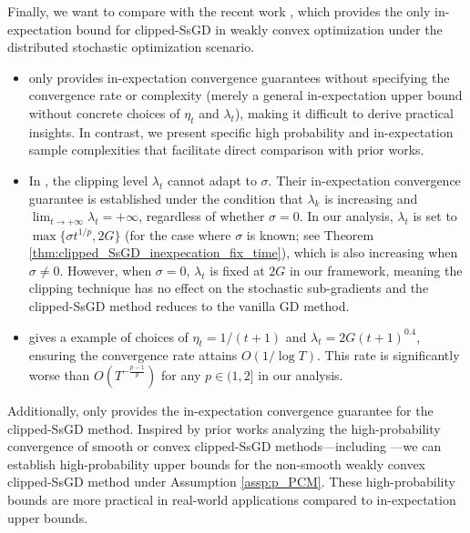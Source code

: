 \documentclass{article}
\begin{document}
Finally, we want to compare with the recent work \citep{hu_2025}, which provides the only in-expectation bound for clipped-SsGD in weakly convex optimization under the distributed stochastic optimization scenario.
\begin{itemize}
    \item \citep{hu_2025} only provides in-expectation convergence guarantees without specifying the convergence rate or complexity (merely a general in-expectation upper bound without concrete choices of $\eta_t$ and $\lambda_t$), making it difficult to derive practical insights. In contrast, we present specific high probability and in-expectation sample complexities that facilitate direct comparison with prior works.
    \item In \citep{hu_2025}, the clipping level $\lambda_t$ cannot adapt to $\sigma$. Their in-expectation convergence guarantee is established under the condition that $\lambda_k$ is increasing and $\lim_{t\rightarrow +\infty}\lambda_t=+\infty$, regardless of whether $\sigma = 0$. In our analysis, $\lambda_t$ is set to $\max\{\sigma t^{1/p},2G\}$ (for the case where $\sigma$ is known; see Theorem \ref{thm:clipped_SsGD_inexpecation_fix_time}), which is also increasing when $\sigma \neq 0$. However, when $\sigma = 0$, $\lambda_t$ is fixed at $2G$ in our framework, meaning the clipping technique has no effect on the stochastic sub-gradients and the clipped-SsGD method reduces to the vanilla GD method.
    \item \citep{hu_2025} gives a example of choices of $\eta_t = 1/(t+1)$ and $\lambda_t = 2G(t+1)^{0.4}$, ensuring the convergence rate attains $O(1/\log T)$. This rate is significantly worse than $O(T^{-\frac{p-1}{p}})$ for any $p \in (1, 2]$ in our analysis.
\end{itemize}
Additionally, \citep{hu_2025} only provides the in-expectation convergence guarantee for the clipped-SsGD method. Inspired by prior works analyzing the high-probability convergence of smooth or convex clipped-SsGD methods—including \citep{Cutkosky_2021,liu_2023c,liuzijian_2023,liu_2023stochasticnonsmoothconvexoptimization,Nguyen_2023,chezhegov_2025}—we can establish high-probability upper bounds for the non-smooth weakly convex clipped-SsGD method under Assumption \ref{assp:p_PCM}. These high-probability bounds are more practical in real-world applications compared to in-expectation upper bounds.
\end{document}
